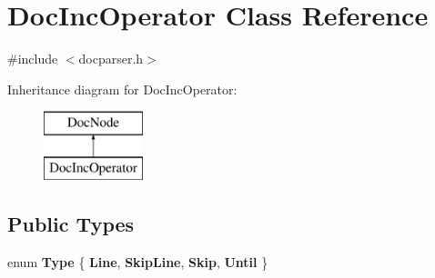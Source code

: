 \hypertarget{class_doc_inc_operator}{}\section{Doc\+Inc\+Operator Class Reference}
\label{class_doc_inc_operator}


{\ttfamily \#include $<$docparser.\+h$>$}

Inheritance diagram for Doc\+Inc\+Operator\+:\begin{figure}[H]
\begin{center}
\leavevmode
\includegraphics[height=2.000000cm]{class_doc_inc_operator}
\end{center}
\end{figure}
\subsection*{Public Types}
\begin{DoxyCompactItemize}
\item 
\mbox{\label{class_doc_inc_operator_ae7a155da5a206f51e93edc166bd64970}} 
enum {\bfseries Type} \{ {\bfseries Line}, 
{\bfseries Skip\+Line}, 
{\bfseries Skip}, 
{\bfseries Until}
 \}
\end{DoxyCompactItemize}
